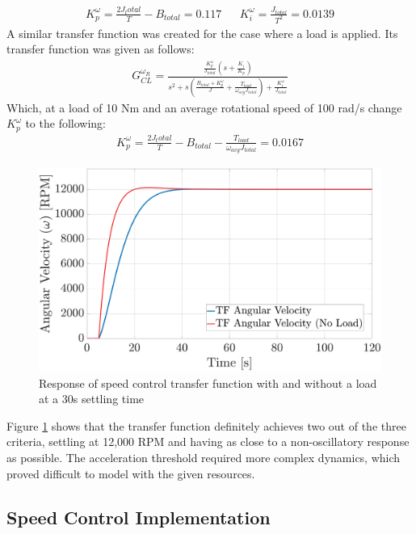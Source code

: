         \begin{align}
            K_p^\omega = \frac{2J_total}{T} - B_{total} = 0.117 && K_i^\omega = \frac{J_{total}}{T^2} = 0.0139
        \end{align}
        A similar transfer function was created for the case where a load is applied. Its transfer function was given as follows:
        \begin{align}
             G_{CL}^{\omega_R} = \frac{\frac{K_p^\omega}{J_{total}}\left(s + \frac{K_i}{K_p}\right)}{s^2 + s\left(\frac{B_{total}+K_p^\omega}{J} + \frac{T_{load}}{\omega_{avg}J_{total}}\right) + \frac{K_i^\omega}{J_{total}}}
        \end{align}
        Which, at a load of 10 Nm and an average rotational speed of 100 rad/s change \(K_p^\omega\) to the following:
        \begin{align}
            K_p^\omega = \frac{2J_total}{T} - B_{total} - \frac{T_{load}}{\omega_{avg}J_{total}} = 0.0167
        \end{align}
        \begin{figure}[tbh!]
            \centering
            \includegraphics[width=0.6\linewidth]{PEMDT Exam Report/img/Speed Control TF.jpg}
            \caption{Response of speed control transfer function with and without a load at a 30s settling time}
            \label{fig: speed control tf}
        \end{figure}
        Figure \ref{fig: speed control tf} shows that the transfer function definitely achieves two out of the three criteria, settling at 12,000 RPM and having as close to a non-oscillatory response as possible. The acceleration threshold required more complex dynamics, which proved difficult to model with the given resources.

    \subsection{Speed Control Implementation}